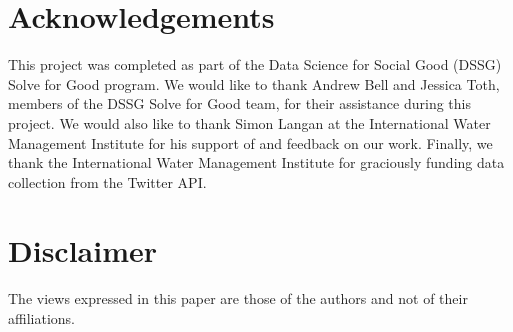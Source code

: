 \documentclass{article}
\begin{document}
\section*{Acknowledgements}

This project was completed as part of the Data Science for Social Good (DSSG) Solve for Good
program. We would like to thank Andrew Bell and Jessica Toth, members of the DSSG Solve for Good
team, for their assistance during this project. We would also like to thank Simon Langan at the
International Water Management Institute for his support of and feedback on our work. Finally, we
thank the International Water Management Institute for graciously funding data collection from the
Twitter API.

\section*{Disclaimer}
The views expressed in this paper are those of the authors and not of their affiliations.


\end{document}
